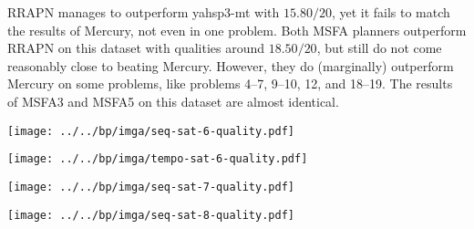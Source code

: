 \documentclass[a0paper,fontscale=0.285]{baposter} %
\begin{document}
\begin{poster}
{\begin{multicols}{3}
RRAPN manages to outperform yahsp3-mt with $15.80/20$, yet it fails
to match the results of Mercury, not even in one problem.
Both MSFA planners outperform RRAPN on this dataset with qualities around $18.50/20$,
but still do not come reasonably close to beating Mercury.
However, they do (marginally) outperform Mercury on some problems, like
problems 4--7, 9--10, 12, and 18--19.
The results of MSFA3 and MSFA5 on this dataset are almost identical.

\begin{center}
\texttt{[image: ../../bp/imga/seq-sat-6-quality.pdf]}
\end{center}

\begin{center}
\texttt{[image: ../../bp/imga/tempo-sat-6-quality.pdf]}
\end{center}

\begin{center}
\texttt{[image: ../../bp/imga/seq-sat-7-quality.pdf]}
\end{center}

\begin{center}
\texttt{[image: ../../bp/imga/seq-sat-8-quality.pdf]}
\end{center}

\end{multicols}
}





\end{poster}
\end{document}
